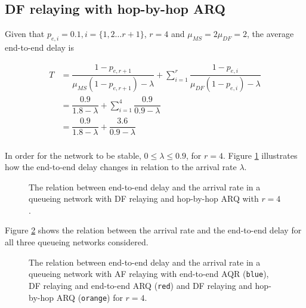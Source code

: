 \subsection{DF relaying with hop-by-hop ARQ}

Given that $p_{e,i} = 0.1, i = \{1,2 \dots r+1\}$, $r=4$ and
$\mu_{MS} = 2\mu_{DF} = 2$, the average end-to-end delay is

\begin{align*}
  T &= \dfrac{1 - p_{e,r+1}}{\mu_{MS}(1 - p_{e,r+1}) - \lambda} + \sum\limits_{i=1}^r \dfrac{1-p_{e,i}}{\mu_{DF} (1 - p_{e,i}) - \lambda} \\
  ~ &= \dfrac{0.9}{1.8 - \lambda} + \sum\limits_{i=1}^4 \dfrac{0.9}{0.9 - \lambda} \\
  ~ &= \dfrac{0.9}{1.8 - \lambda} + \dfrac{3.6}{0.9 - \lambda} \\
\end{align*}

In order for the network to be stable,
$0 \leq \lambda \leq 0.9$, for $r=4$. Figure
\ref{fig:05_arrival_rate_df_hbh} illustrates how the end-to-end delay changes in
relation to the arrival rate $\lambda$.

\begin{figure}\centering
  
  \caption{The relation between end-to-end delay and the arrival rate in a
    queueing network with DF relaying and hop-by-hop ARQ with $r=4$.}
  \label{fig:05_arrival_rate_df_hbh}
\end{figure}


Figure \ref{fig:05_arrival_rates} shows the relation between the arrival rate
and the end-to-end delay for all three queueing networks considered.

\begin{figure}[H]\centering
  
  \caption{The relation between end-to-end delay and the arrival rate in a
    queueing network with AF relaying with end-to-end AQR (\texttt{blue}),
    DF relaying and end-to-end ARQ (\texttt{red}) and
    DF relaying and hop-by-hop ARQ (\texttt{orange}) for $r=4$.}
  \label{fig:05_arrival_rates}
\end{figure}
